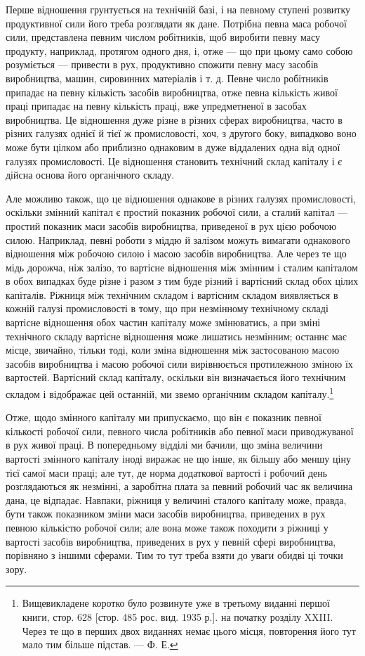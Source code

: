 Перше відношення грунтується на технічній базі, і на певному
ступені розвитку продуктивної сили його треба розглядати
як дане. Потрібна певна маса робочої сили, представлена
певним числом робітників, щоб виробити певну масу продукту,
наприклад, протягом одного дня, і, отже — що при цьому само
собою розуміється — привести в рух, продуктивно спожити
певну масу засобів виробництва, машин, сировинних матеріалів
і т. д. Певне число робітників припадає на певну кількість засобів
виробництва, отже певна кількість живої праці припадає
на певну кількість праці, вже упредметненої в засобах виробництва.
Це відношення дуже різне в різних сферах виробництва,
часто в різних галузях однієї й тієї ж промисловості, хоч, з другого
боку, випадково воно може бути цілком або приблизно
однаковим в дуже віддалених одна від одної галузях промисловості.
Це відношення становить технічний склад капіталу і є дійсна
основа його органічного складу.

Але можливо також, що це відношення однакове в різних
галузях промисловості, оскільки змінний капітал є простий показник
робочої сили, а сталий капітал — простий показник маси
засобів виробництва, приведеної в рух цією робочою силою.
Наприклад, певні роботи з міддю й залізом можуть вимагати
однакового відношення між робочою силою і масою засобів
виробництва. Але через те що мідь дорожча, ніж залізо, то вартісне
відношення між змінним і сталим капіталом в обох випадках
буде різне і разом з тим буде різний і вартісний склад
обох цілих капіталів. Ріжниця між технічним складом і вартісним
складом виявляється в кожній галузі промисловості
в тому, що при незмінному технічному складі вартісне відношення
обох частин капіталу може змінюватись, а при зміні
технічного складу вартісне відношення може лишатись незмінним;
останнє має місце, звичайно, тільки тоді, коли зміна
відношення між застосованою масою засобів виробництва і масою
робочої сили вирівнюється протилежною зміною їх вартостей.
Вартісний склад капіталу, оскільки він визначається його
технічним складом і відображає цей останній, ми звемо органічним
складом капіталу.\footnote{
Вищевикладене коротко було розвинуте уже в третьому виданні першої
книги, стор. 628 [стор. 485 рос. вид. 1935 р.]. на початку розділу XXIII. Через
те що в перших двох виданнях немає цього місця, повторення його тут мало
тим більше підстав. — Ф. Е.
}

Отже, щодо змінного капіталу ми припускаємо, що він є показник
певної кількості робочої сили, певного числа робітників
або певної маси приводжуваної в рух живої праці. В попередньому
відділі ми бачили, що зміна величини вартості змінного
капіталу іноді виражає не що інше, як більшу або меншу ціну
тієї самої маси праці; але тут, де норма додаткової вартості
і робочий день розглядаються як незмінні, а заробітна плата
за певний робочий час як величина дана, це відпадає. Навпаки,
ріжниця у величині сталого капіталу може, правда, бути також
показником зміни маси засобів виробництва, приведених в рух
певною кількістю робочої сили; але вона може також походити
з ріжниці у вартості засобів виробництва, приведених в рух
у певній сфері виробництва, порівняно з іншими сферами. Тим
то тут треба взяти до уваги обидві ці точки зору.

